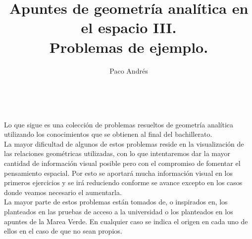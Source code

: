 \documentclass[a4paper,11pt,answers]{exam}
\def \autor{Paco Andrés}
\def \titulo{Apuntes de geometría analítica en el espacio III.\\Problemas de ejemplo.}
\begin{document}
\title{\titulo}
\date{}
\author{\autor}
\maketitle

\begin{center}
\doclicenseLongText\\
\vspace{.25cm}
\doclicenseImage
\end{center}
Lo que sigue es una colección de problemas resueltos de geometría analítica utilizando los conocimientos que se obtienen al final del bachillerato.\\
La mayor dificultad de algunos de estos problemas reside en la visualización de las relaciones geométricas utilizadas, con lo que intentaremos dar la mayor cantidad de información visual posible pero con el compromiso de fomentar el pensamiento espacial. Por esto se aportará mucha información visual en los primeros ejercicios y se irá reduciendo conforme se avance excepto en los casos donde veamos necesario el aumentarla.\\

La mayor parte de estos problemas están tomados de, o inspirados en, los planteados en las pruebas de acceso a la universidad o los planteados en los apuntes de la Marea Verde. En cualquier caso se indica el origen en cada uno de ellos en el caso de que no sean propios.
\end{document}

